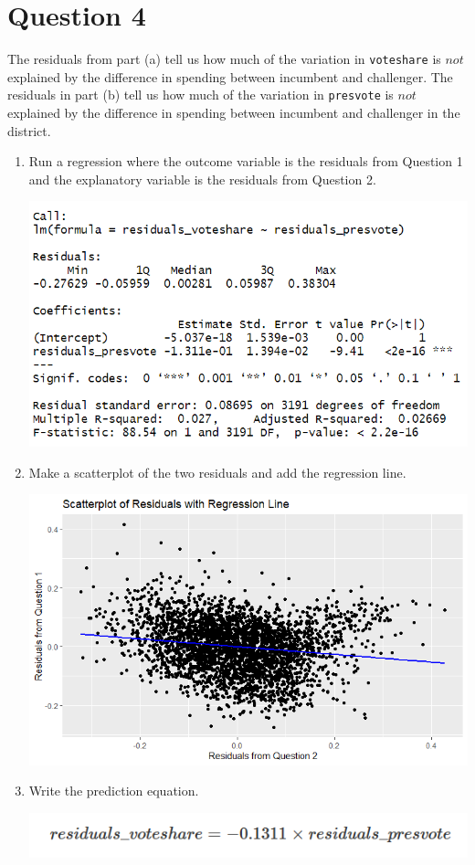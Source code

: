 \documentclass[12pt,letterpaper]{article}
\begin{document}
\newpage	
\section*{Question 4}
\noindent The residuals from part (a) tell us how much of the variation in \texttt{voteshare} is $not$ explained by the difference in spending between incumbent and challenger. The residuals in part (b) tell us how much of the variation in \texttt{presvote} is $not$ explained by the difference in spending between incumbent and challenger in the district.
	\begin{enumerate}
		\item Run a regression where the outcome variable is the residuals from Question 1 and the explanatory variable is the residuals from Question 2.	
		 
		\includegraphics[width=0.8\linewidth]{Q12}
		\item Make a scatterplot of the two residuals and add the regression line. 	\vspace{6cm}
		 
		\includegraphics[width=0.8\linewidth]{Q13}
		\item Write the prediction equation.
		
		\includegraphics[width=0.8\linewidth]{Q14}
	\end{enumerate}
	
\end{document}
